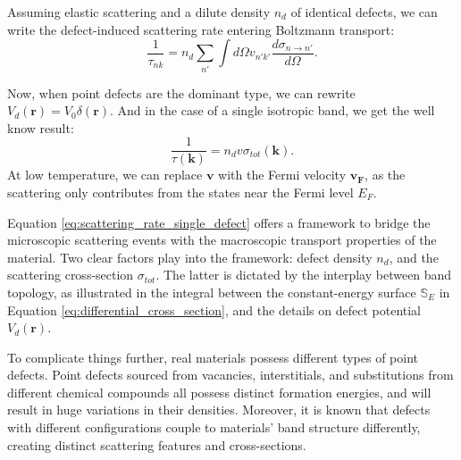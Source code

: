 Assuming elastic scattering and a dilute density $n_d$ of identical defects, we can write the defect-induced scattering rate entering Boltzmann transport: 
\begin{equation}
	\label{eq:scattering_rate_single_defect}
	\frac{1}{\tau_{nk}} = n_d \sum_{n'}\int d\Omega v_{n'k'} \frac{d\sigma_{n\rightarrow n'}}{d\Omega}. 
\end{equation}

Now, when point defects are the dominant type, we can rewrite $V_d(\mathbf{r}) = V_0\delta(\mathbf{r})$. And in the case of a single isotropic band, we get the well know result:
\begin{equation}
	\frac{1}{\tau(\mathbf{k})} = n_d v \sigma_{tot}(\mathbf{k}).
\end{equation}
At low temperature, we can replace $\mathbf{v}$ with the Fermi velocity $\mathbf{v_F}$, as the scattering only contributes from the states near the Fermi level $E_F$. 

Equation \ref{eq:scattering_rate_single_defect} offers a framework to bridge the microscopic scattering events with the macroscopic transport properties of the material. Two clear factors play into the framework: defect density $n_d$, and the scattering cross-section $\sigma_{tot}$. The latter is dictated by the interplay between band topology, as illustrated in the integral between the constant-energy surface $\mathbb{S}_E$ in Equation \ref{eq:differential_cross_section}, and the details on defect potential $V_d(\mathbf{r})$. 

To complicate things further, real materials possess different types of point defects\cite{stuartScanningTunnellingMicroscopy2021}\cite{bertoldoQuantumPointDefects2022}. Point defects sourced from vacancies, interstitials, and substitutions from different chemical compounds all possess distinct formation energies\cite{bertoldoQuantumPointDefects2022}\cite{lopesDefectFormationEnergy2023}, and will result in huge variations in their densities. Moreover, it is known that defects with different configurations couple to materials' band structure differently, creating distinct scattering features and cross-sections\cite{butlerQuasiparticleInterferenceZrSiS2017}\cite{chiSignInversionSuperconducting2014}\cite{derryQuasiparticleInterferenceMagnetic2015a}.

